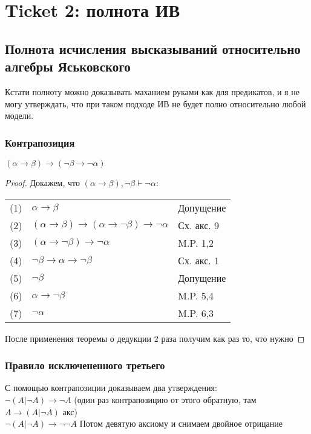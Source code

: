 \section{Ticket 2: полнота ИВ}
\label{sec-4}
\subsection{Полнота исчисления высказываний относительно алгебры Яськовского}
\label{sec-4-1}
Кстати полноту можно доказывать маханием руками как для предикатов,
и я не могу утверждать, что при таком подходе ИВ не будет полно
относительно любой модели.
\subsubsection{Контрапозиция}
\label{sec-4-1-1}
\begin{lemma}
$(\alpha \to \beta) \to (\lnot \beta \to \lnot \alpha)$\\
\end{lemma}
\begin{proof}
Докажем, что $(\alpha \to \beta), \lnot \beta \vdash \lnot \alpha$:\\
\begin{tabular}{lll}
(1) & $\alpha \to \beta$& Допущение\\
(2) & $(\alpha \to \beta) \to (\alpha \to \lnot \beta) \to \lnot \alpha$& Сх. акс. 9\\
(3) & $(\alpha \to \lnot \beta) \to \lnot \alpha$& M.P. 1,2\\
(4) & $\lnot \beta \to \alpha \to \lnot \beta$& Сх. акс. 1\\
(5) & $\lnot \beta$& Допущение\\
(6) & $\alpha \to \lnot \beta$& M.P. 5,4\\
(7) & $\lnot \alpha$& M.P. 6,3\\
\end{tabular}
После применения теоремы о дедукции 2 раза получим как раз то, что нужно
\end{proof}
\subsubsection{Правило исключененного третьего}
\label{sec-4-1-2}
С помощью контрапозиции доказываем два утверждения:\\
$\lnot (A|\lnot A)\to \lnot A$ (один раз контрапозицию от этого обратную, там $A\to (A|\lnot A)$ акс) \\
$\lnot (A|\lnot A)\to \lnot \lnot A$
Потом девятую аксиому и снимаем двойное отрицание
